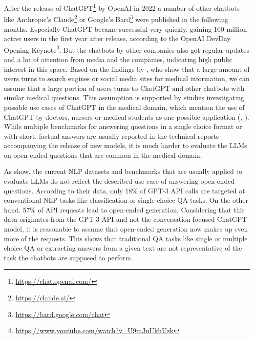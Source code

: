 After the release of ChatGPT\footnote{\url{https://chat.openai.com/}} by OpenAI in 2022 a number of other chatbots like Anthropic's Claude\footnote{\url{https://claude.ai/}} or Google's Bard\footnote{\url{https://bard.google.com/chat}} were published in the following months.
Especially ChatGPT became successful very quickly, gaining 100 million active users in the first year after release, according to the OpenAI DevDay Opening Keynote\footnote{\url{https://www.youtube.com/watch?v=U9mJuUkhUzk}}.
But the chatbots by other companies also got regular updates and a lot of attention from media and the companies, indicating high public interest in this space.
Based on the findings by \cite{de:2014:seeking}, who show that a large amount of users turns to search engines or social media sites for medical information, we can assume that a large portion of users turns to ChatGPT and other chatbots with similar medical questions.
This assumption is supported by studies investigating possible use cases of ChatGPT in the medical domain, which mention the use of ChatGPT by doctors, nursers or medical students as one possible application (\cite{dave:2023:chatgpt}, \cite{khan:2023:chatgpt}).
While multiple benchmarks for answering questions in a single choice format or with short, factual answers are usually reported in the technical reports accompanying the release of new models, it is much harder to evaluate the LLMs on open-ended questions that are common in the medical domain.

As \cite{ouyang:2022:Training} show, the current NLP datasets and benchmarks that are usually applied to evaluate LLMs do not reflect the described use case of answering open-ended questions.
According to their data, only 18\% of GPT-3 API calls are targeted at conventional NLP tasks like classification or single choice QA tasks.
On the other hand, 57\% of API requests lead to open-ended generation.
Considering that this data originates from the GPT-3 API and not the conversation-focused ChatGPT model, it is reasonable to assume that open-ended generation now makes up even more of the requests.
This shows that traditional QA tasks like single or multiple choice QA or extracting answers from a given text are not representative of the task the chatbots are supposed to perform.

